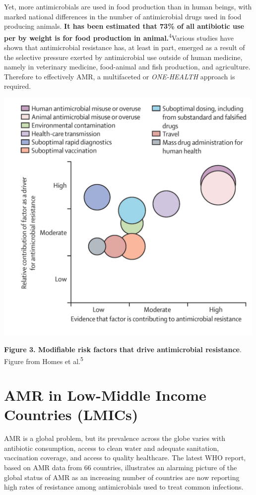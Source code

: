\documentclass[
]{book}
\begin{document}
Yet, more antimicrobials are used in food production than in human beings, with marked national differences in the number of antimicrobial drugs used in food producing animals. \textbf{It has been estimated that 73\% of all antibiotic use per by weight is for food production in animal.}\textsuperscript{4}Various studies have shown that antimicrobial resistance has, at least in part, emerged as a result of the selective pressure exerted by antimicrobial use outside of human medicine, namely in veterinary medicine, food-animal and fish production, and agriculture. Therefore to effectively AMR, a multifaceted or \emph{ONE-HEALTH} approach is required.

\includegraphics[width=5.20833in,height=\textheight]{images/modifiablerisk.png}

\textbf{Figure 3. Modifiable risk factors that drive antimicrobial resistance}. Figure from Homes et al.\textsuperscript{5}

\hypertarget{amr-in-low-middle-income-countries-lmics}{%
\section*{AMR in Low-Middle Income Countries (LMICs)}\label{amr-in-low-middle-income-countries-lmics}}

AMR is a global problem, but its prevalence across the globe varies with antibiotic consumption, access to clean water and adequate sanitation, vaccination coverage, and access to quality healthcare. The latest WHO report, based on AMR data from 66 countries, illustrates an alarming picture of the global status of AMR as an increasing number of countries are now reporting high rates of resistance among antimicrobials used to treat common infections.
\end{document}

